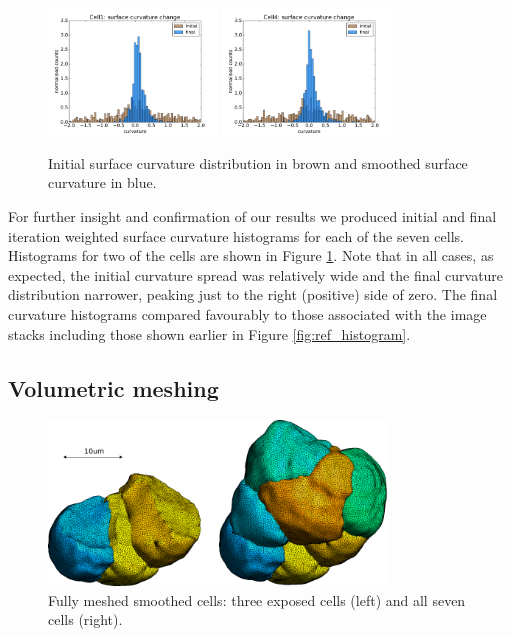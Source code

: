 \documentclass[a4paper,10pt]{article}
\begin{document}
\begin{figure}[H]
\begin{center}
\includegraphics[width=0.4\textwidth]{images/cell1_curv_morph.pdf}
\includegraphics[width=0.4\textwidth]{images/cell4_curv_morph.pdf}
\end{center}
\caption{Initial surface curvature distribution in brown and smoothed surface curvature in blue.}
\label{fig:morph_histogram}
\end{figure}

For further insight and confirmation of our results we produced initial and final iteration weighted surface curvature histograms for each of the seven cells. Histograms for two of the cells are shown in Figure \ref{fig:morph_histogram}. Note that in all cases, as expected, the initial curvature spread was relatively wide and the final curvature distribution narrower, peaking just to the right (positive) side of zero. The final curvature histograms compared favourably to those associated with the image stacks including those shown earlier in Figure \ref{fig:ref_histogram}.\\

\subsection{Volumetric meshing}

\begin{figure}[H]
\begin{center}
\includegraphics[width=0.8\textwidth]{images/smooth.pdf}
\end{center}
\caption{Fully meshed smoothed cells: three exposed cells (left) and all seven cells (right).}
\label{fig:smooth}
\end{figure}
\end{document}
